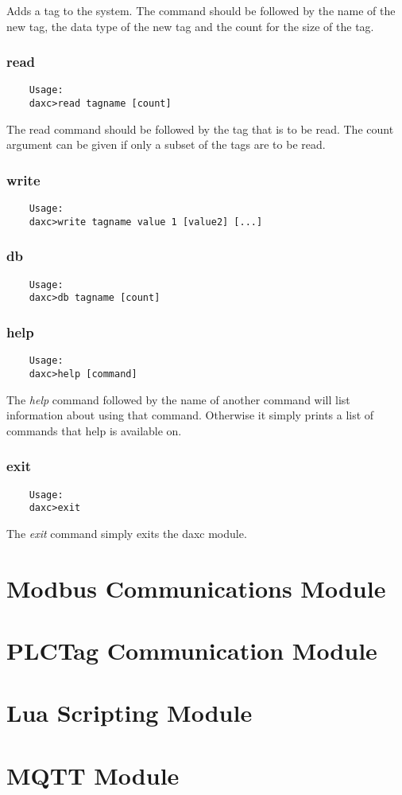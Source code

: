 	Adds a tag to the system.  The command should be followed by the name of the new
	tag, the data type of the new tag and the count for the size of the tag.

	\subsection{read}
	\begin{verbatim}
	Usage:
	daxc>read tagname [count]
	\end{verbatim}

	The read command should be followed by the tag that is to be read.  The
	count argument can be given if only a subset of the tags are to be read.

	\subsection{write}
	\begin{verbatim}
	Usage:
	daxc>write tagname value 1 [value2] [...]
	\end{verbatim}

	\subsection{db}
	\begin{verbatim}
	Usage:
	daxc>db tagname [count]
	\end{verbatim}

	\subsection{help}
	\begin{verbatim}
	Usage:
	daxc>help [command]
	\end{verbatim}

	The \textit{help} command followed by the name of another command will list
	information about using that command. Otherwise it simply prints a list of
	commands that help is available on.

	\subsection{exit}
	\begin{verbatim}
	Usage:
	daxc>exit
	\end{verbatim}
	The \textit{exit} command simply exits the daxc module.

	\chapter{Modbus Communications Module}
	

	\chapter{PLCTag Communication Module}
	

	\chapter{Lua Scripting Module}
	

	\chapter{MQTT Module}
	



